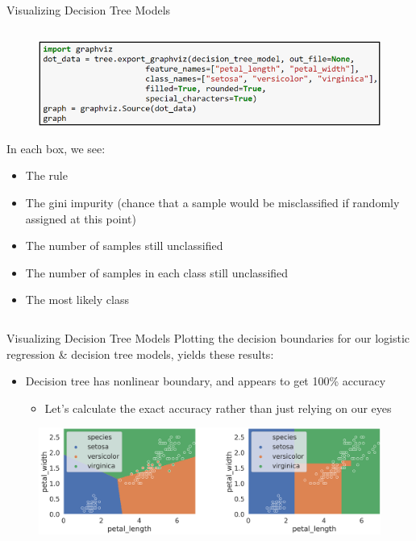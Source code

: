 \documentclass[aspectratio=169]{../latex_main/tntbeamer}  %
\begin{document}
\begin{frame}{Visualizing Decision Tree Models }
\begin{columns}
	        
	        \begin{column}{.6\textwidth}
	                \begin{figure}
	                    \includegraphics[scale=.55]{Bild24}
	                \end{figure}
	                In each box, we see:
	                \begin{itemize}
	                    \item The rule
	                    \item The gini impurity (chance that a sample would be misclassified if randomly assigned at this point)
	                    \item The number of samples still unclassified
	                    \item The number of samples in each class still unclassified
	                    \item The most likely class
	                \end{itemize}
	        \end{column}
	    \end{columns}
	\end{frame}
	
	
	\begin{frame}{Visualizing Decision Tree Models}
	    Plotting the decision boundaries for our logistic regression \& decision tree models, yields these results:
	    \begin{itemize}
	        \item Decision tree has nonlinear boundary, and appears to get 100\% accuracy
	        \begin{itemize}
	            \item Let’s calculate the exact accuracy rather than just relying on our eyes
	        \end{itemize}
	    \end{itemize}
	    \begin{figure}
	        \centering
	        \includegraphics[scale=.45]{Bild26}
	    \end{figure}
	\end{frame}
	
\end{document}
